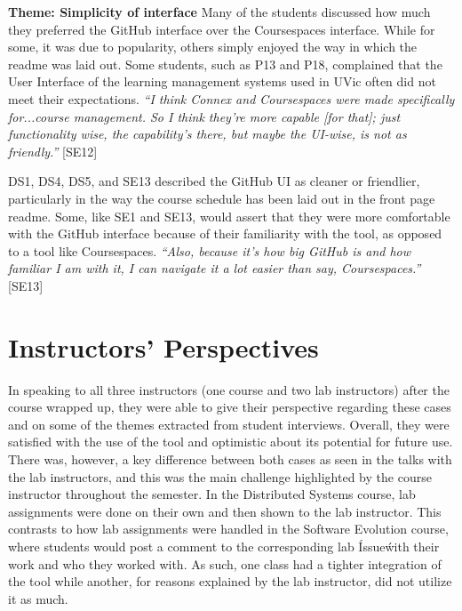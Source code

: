 \textbf{Theme: Simplicity of interface} \break
Many of the students discussed how much they preferred the GitHub interface over the Coursespaces interface. While for some, it was due to popularity, others simply enjoyed the way in which the readme was laid out. Some students, such as P13 and P18, complained that the User Interface of the learning management systems used in UVic often did not meet their expectations. \textit{``I think Connex and Coursespaces were made specifically for...course management. So I think they're more capable [for that]; just functionality wise, the capability's there, but maybe the UI-wise, is not as friendly.''} [SE12]

DS1, DS4, DS5, and SE13 described the GitHub UI as cleaner or friendlier, particularly in the way the course schedule has been laid out in the front page readme. Some, like SE1 and SE13, would assert that they were more comfortable with the GitHub interface because of their familiarity with the tool, as opposed to a tool like Coursespaces. \textit{``Also, because it's how big GitHub is and how familiar I am with it, I can navigate it a lot easier than say, Coursespaces.''} [SE13]


\section{Instructors' Perspectives}
In speaking to all three instructors (one course and two lab instructors) after the course wrapped up, they were able to give their perspective regarding these cases and on some of the themes extracted from student interviews. Overall, they were satisfied with the use of the tool and optimistic about its potential for future use. There was, however, a key difference between both cases as seen in the talks with the lab instructors, and this was the main challenge highlighted by the course instructor throughout the semester. In the Distributed Systems course, lab assignments were done on their own and then shown to the lab instructor. This contrasts to how lab assignments were handled in the Software Evolution course, where students would post a comment to the corresponding lab \'Issue\' with their work and who they worked with. As such, one class had a tighter integration of the tool while another, for reasons explained by the lab instructor, did not utilize it as much.

